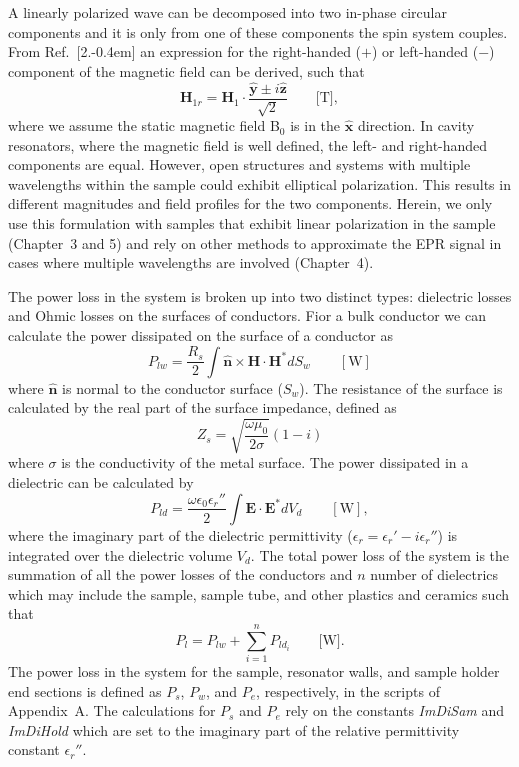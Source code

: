 A linearly polarized wave can be decomposed into two in-phase circular components and it is only from one of these components the spin system couples. \cite{abragam1961} From Ref.~[2.\kern-0.4em] an expression for the right-handed ($+$) or left-handed ($-$) component of the magnetic field can be derived, such that
\begin{equation}
    \mathbf{H}_{1r} =  \mathbf{H}_{1}\cdot\frac{\mathbf{\hat{y}} \pm i\mathbf{\hat{z}}}{\sqrt{2}} \qquad \text{[T]}, \label{circpoleH}
\end{equation}
where we assume the static magnetic field B$_0$ is in the $\mathbf{\hat{x}}$ direction. In cavity resonators, where the magnetic field is well defined, the left- and right-handed components are equal. However, open structures and systems with multiple wavelengths within the sample could exhibit elliptical polarization. This results in different magnitudes and field profiles for the two components. Herein, we only use this formulation with samples that exhibit linear polarization in the sample (Chapter~3 and 5) and rely on other methods to approximate the EPR signal in cases where multiple wavelengths are involved (Chapter~4).

The power loss in the system is broken up into two distinct types: dielectric losses and Ohmic losses on the surfaces of conductors. Fior a bulk conductor we can calculate the power dissipated on the surface of a conductor as
\begin{equation}
    P_{lw} = \frac{R_s}{2}\int \mathbf{\hat{n}}\times\mathbf{H}\cdot\mathbf{H}^* dS_w \qquad [\text{W}]
\end{equation}
where $\mathbf{\hat{n}}$ is normal to the conductor surface ($S_w$). The resistance of the surface is calculated by the real part of the surface impedance, defined as
\begin{equation}
    Z_s = \sqrt{\frac{\omega \mu_0}{2 \sigma}}(1-i)
\end{equation}
where $\sigma$ is the conductivity of the metal surface. The power dissipated in a dielectric can be calculated by
\begin{equation}
    P_{ld} = \frac{\omega \epsilon_0 \epsilon_r''}{2}\int \mathbf{E} \cdot \mathbf{E}^* dV_d \qquad [\text{W}],
\end{equation}
where the imaginary part of the dielectric permittivity ($\epsilon_r = \epsilon_r' - i \epsilon_r''$) is integrated over the dielectric volume $V_d$. \cite{jackson1975classical,harrington1961time} The total power loss of the system is the summation of all the power losses of the conductors and $n$ number of dielectrics which may include the sample, sample tube, and other plastics and ceramics such that
\begin{equation}
    P_l = P_{lw} + \sum_{i=1}^n P_{ld_i} \qquad \text{[W].}
\end{equation}
The power loss in the system for the sample, resonator walls, and sample holder end sections is defined as $P_s$, $P_w$, and $P_e$, respectively, in the scripts of Appendix~A. The calculations for $P_s$ and $P_e$ rely on the constants \textit{ImDiSam} and \textit{ImDiHold} which are set to the imaginary part of the relative permittivity constant $\epsilon_r''$.

